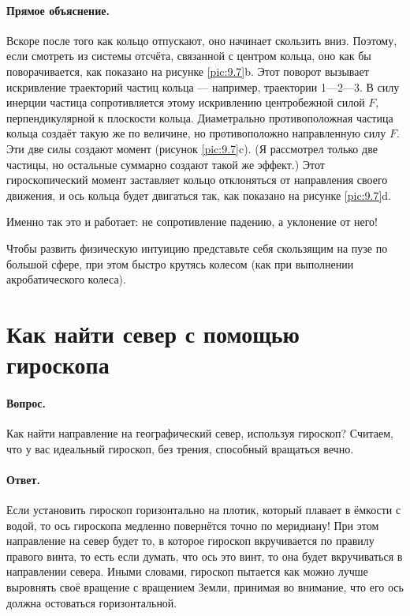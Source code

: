 \paragraph{Прямое объяснение.}
Вскоре после того как кольцо отпускают, оно начинает скользить вниз.
Поэтому, если смотреть из системы отсчёта, связанной с центром кольца, оно как бы поворачивается, как показано на рисунке \ref{pic:9.7}b.
Этот поворот вызывает искривление траекторий частиц кольца --- например, траектории 1---2---3.
В силу инерции частица сопротивляется этому искривлению центробежной силой $F$, перпендикулярной к плоскости кольца.
Диаметрально противоположная частица кольца создаёт такую же по величине, но противоположно направленную силу $F$.
Эти две силы создают момент (рисунок \ref{pic:9.7}c).
(Я рассмотрел только две частицы, но остальные суммарно создают такой же эффект.)
Этот гироскопический момент заставляет кольцо отклоняться от направления своего движения, и ось кольца будет двигаться так, как показано на рисунке \ref{pic:9.7}d.

Именно так это и работает: не сопротивление падению, а уклонение от него!

Чтобы развить физическую интуицию представьте себя скользящим на пузе по большой сфере, при этом быстро крутясь колесом (как при выполнении акробатического колеса).

\section{Как найти север с помощью гироскопа}

\paragraph{Вопрос.}
Как найти направление на географический север, используя гироскоп?
Считаем, что у вас идеальный гироскоп, без трения, способный вращаться вечно.

\paragraph{Ответ.}
Если установить гироскоп горизонтально на плотик, который плавает в ёмкости с водой,
то ось гироскопа медленно повернётся точно по меридиану!
При этом направление на север будет то, в которое гироскоп вкручивается по правилу правого винта, то есть если думать, что ось это винт, то она будет вкручиваться в направлении севера.
Иными словами, гироскоп пытается как можно лучше выровнять своё вращение с вращением Земли, принимая во внимание, что его ось должна остоваться горизонтальной.

